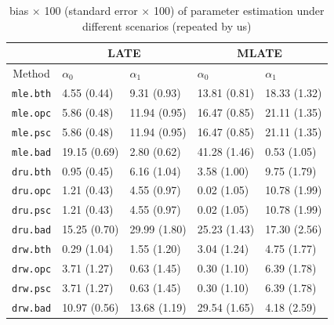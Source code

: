 \documentclass{article}
\begin{document}
\begin{table}
\footnotesize
\centering
\begin{tabular}[h]{c|p{2cm}<{\centering}p{2cm}<{\centering}|p{2cm}<{\centering}p{2cm}<{\centering}}
\toprule
    & \multicolumn{2}{c|}{LATE} &\multicolumn{2}{c}{MLATE}\\
\midrule
    Method & $\alpha_0$ & $\alpha_1$ & $\alpha_0$ & $\alpha_1$\\
\midrule
\texttt{mle.bth}&4.55 (0.44) & 9.31 (0.93)&13.81 (0.81) & 18.33 (1.32)\\
\texttt{mle.opc}&5.86 (0.48) & 11.94 (0.95)&16.47 (0.85) & 21.11 (1.35)\\
\texttt{mle.psc}&5.86 (0.48) & 11.94 (0.95)&16.47 (0.85) & 21.11 (1.35)\\
\texttt{mle.bad}&19.15 (0.69) & 2.80 (0.62)&41.28 (1.46) & 0.53 (1.05)\\
\texttt{dru.bth}&0.95 (0.45) & 6.16 (1.04)&3.58 (1.00) & 9.75 (1.79)\\
\texttt{dru.opc}&1.21 (0.43) & 4.55 (0.97)&0.02 (1.05) & 10.78 (1.99)\\
\texttt{dru.psc}&1.21 (0.43) & 4.55 (0.97)&0.02 (1.05) & 10.78 (1.99)\\
\texttt{dru.bad}&15.25 (0.70) & 29.99 (1.80)&25.23 (1.43) & 17.30 (2.56)\\
\texttt{drw.bth}&0.29 (1.04) & 1.55 (1.20)&3.04 (1.24) & 4.75 (1.77)\\
\texttt{drw.opc}&3.71 (1.27) & 0.63 (1.45)&0.30 (1.10) & 6.39 (1.78)\\
\texttt{drw.psc}&3.71 (1.27) & 0.63 (1.45)&0.30 (1.10) & 6.39 (1.78)\\
\texttt{drw.bad}&10.97 (0.56) & 13.68 (1.19)&29.54 (1.65) & 4.18 (2.59)\\
\bottomrule
\end{tabular}
\caption{bias $\times$ 100 (standard error $\times$ 100) of parameter estimation under different scenarios (repeated by us)}
\label{ourbias}
\end{table}
\end{document}
